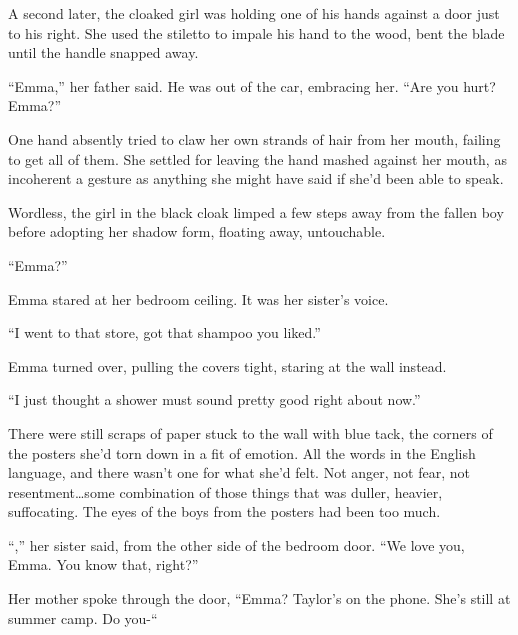 A second later, the cloaked girl was holding one of his hands against a door just to his right.  She used the stiletto to impale his hand to the wood, bent the blade until the handle snapped away.



``Emma,'' her father said.  He was out of the car, embracing her.  ``Are you hurt?  Emma?''



One hand absently tried to claw her own strands of hair from her mouth, failing to get all of them.  She settled for leaving the hand mashed against her mouth, as incoherent a gesture as anything she might have said if she'd been able to speak.



Wordless, the girl in the black cloak limped a few steps away from the fallen boy before adopting her shadow form, floating away, untouchable.



\blacksquare



``Emma?''



Emma stared at her bedroom ceiling.  It was her sister's voice.



``I went to that store, got that shampoo you liked.''



Emma turned over, pulling the covers tight, staring at the wall instead.



``I just thought a shower must sound pretty good right about now.''



There were still scraps of paper stuck to the wall with blue tack, the corners of the posters she'd torn down in a fit of emotion.  All the words in the English language, and there wasn't one for what she'd felt.  Not anger, not fear, not resentment\ldots some combination of those things that was duller, heavier, suffocating.  The eyes of the boys from the posters had been too much.



``\ldotsOkay,'' her sister said, from the other side of the bedroom door.  ``We love you, Emma.  You know that, right?''



\blacksquare



Her mother spoke through the door, ``Emma?  Taylor's on the phone.  She's still at summer camp.  Do you-``



